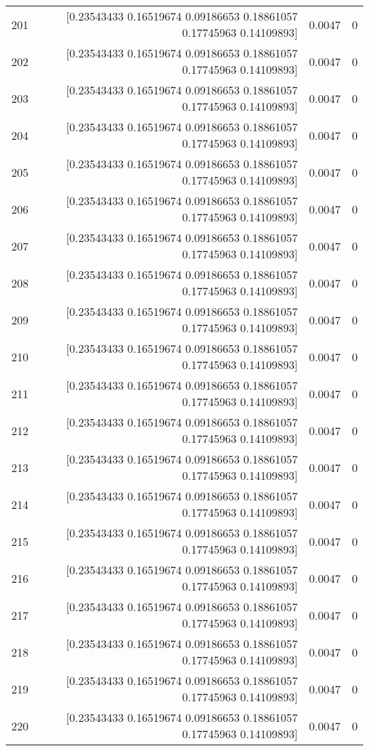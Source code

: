 \begin{longtable}{lrrr}
201 & [0.23543433 0.16519674 0.09186653 0.18861057 0.17745963 0.14109893] & 0.0047 & 0 \\
202 & [0.23543433 0.16519674 0.09186653 0.18861057 0.17745963 0.14109893] & 0.0047 & 0 \\
203 & [0.23543433 0.16519674 0.09186653 0.18861057 0.17745963 0.14109893] & 0.0047 & 0 \\
204 & [0.23543433 0.16519674 0.09186653 0.18861057 0.17745963 0.14109893] & 0.0047 & 0 \\
205 & [0.23543433 0.16519674 0.09186653 0.18861057 0.17745963 0.14109893] & 0.0047 & 0 \\
206 & [0.23543433 0.16519674 0.09186653 0.18861057 0.17745963 0.14109893] & 0.0047 & 0 \\
207 & [0.23543433 0.16519674 0.09186653 0.18861057 0.17745963 0.14109893] & 0.0047 & 0 \\
208 & [0.23543433 0.16519674 0.09186653 0.18861057 0.17745963 0.14109893] & 0.0047 & 0 \\
209 & [0.23543433 0.16519674 0.09186653 0.18861057 0.17745963 0.14109893] & 0.0047 & 0 \\
210 & [0.23543433 0.16519674 0.09186653 0.18861057 0.17745963 0.14109893] & 0.0047 & 0 \\
211 & [0.23543433 0.16519674 0.09186653 0.18861057 0.17745963 0.14109893] & 0.0047 & 0 \\
212 & [0.23543433 0.16519674 0.09186653 0.18861057 0.17745963 0.14109893] & 0.0047 & 0 \\
213 & [0.23543433 0.16519674 0.09186653 0.18861057 0.17745963 0.14109893] & 0.0047 & 0 \\
214 & [0.23543433 0.16519674 0.09186653 0.18861057 0.17745963 0.14109893] & 0.0047 & 0 \\
215 & [0.23543433 0.16519674 0.09186653 0.18861057 0.17745963 0.14109893] & 0.0047 & 0 \\
216 & [0.23543433 0.16519674 0.09186653 0.18861057 0.17745963 0.14109893] & 0.0047 & 0 \\
217 & [0.23543433 0.16519674 0.09186653 0.18861057 0.17745963 0.14109893] & 0.0047 & 0 \\
218 & [0.23543433 0.16519674 0.09186653 0.18861057 0.17745963 0.14109893] & 0.0047 & 0 \\
219 & [0.23543433 0.16519674 0.09186653 0.18861057 0.17745963 0.14109893] & 0.0047 & 0 \\
220 & [0.23543433 0.16519674 0.09186653 0.18861057 0.17745963 0.14109893] & 0.0047 & 0 \\

\end{longtable}
